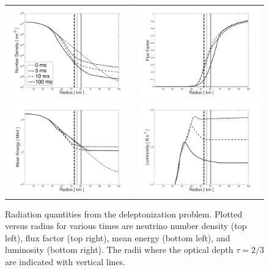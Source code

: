 \documentclass[11pt,letterpaper,twoside,english,final]{article}
\begin{document}
\begin{figure}[h]
  \centering
  \begin{tabular}{cc}
    \includegraphics[width=.475\textwidth]{./Figures/DeleptonizationProblem1D_NumberDensity.png} &
    \includegraphics[width=.475\textwidth]{./Figures/DeleptonizationProblem1D_FluxFactor.png} \\
    \includegraphics[width=.475\textwidth]{./Figures/DeleptonizationProblem1D_MeanEnergy.png} &
    \includegraphics[width=.475\textwidth]{./Figures/DeleptonizationProblem1D_Luminosity.png}
  \end{tabular}
  \vspace{-0.1in}
  \flushleft\caption[Radiation quantities from the deleptonization problem.]{Radiation quantities from the deleptonization problem.  \textmd{Plotted versus radius for various times are neutrino number density (top left), flux factor (top right), mean energy (bottom left), and luminosity (bottom right).  The radii where the optical depth $\tau=2/3$ are indicated with vertical lines.}}
  \label{fig:deleptonizationProblemRadiation}
\end{figure}
\end{document}
